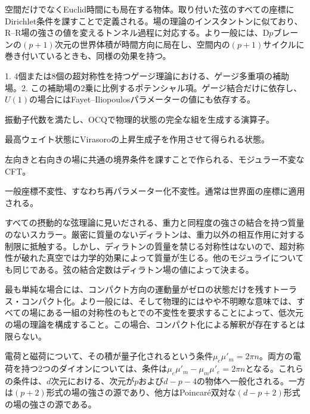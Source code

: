 {空間だけでなくEuclid時間にも局在する物体。取り付いた弦のすべての座標にDirichlet条件を課すことで定義される。場の理論のインスタントンに似ており、R--R場の強さの値を変えるトンネル過程に対応する。より一般には、D$p$ブレーンの$(p+1)$次元の世界体積が時間方向に局在し、空間内の$(p+1)$サイクルに巻き付いているときも、同様の効果を持つ。}


{1. 4個または8個の超対称性を持つゲージ理論における、ゲージ多重項の補助場。2. この補助場の2乗に比例するポテンシャル項。ゲージ結合だけに依存し、$U(1)$の場合にはFayet--Iliopoulosパラメーターの値にも依存する。}

{振動子代数を満たし、OCQで物理的状態の完全な組を生成する演算子。}

{最高ウェイト状態にVirasoroの上昇生成子を作用させて得られる状態。}

{左向きと右向きの場に共通の境界条件を課すことで作られる、モジュラー不変なCFT。}

{一般座標不変性、すなわち再パラメーター化不変性。通常は世界面の座標に適用される。}

{すべての摂動的な弦理論に見いだされる、重力と同程度の強さの結合を持つ質量のないスカラー。厳密に質量のないディラトンは、重力以外の相互作用に対する制限に抵触する。しかし、ディラトンの質量を禁じる対称性はないので、超対称性が破れた真空では力学的効果によって質量が生じる。他のモジュライについても同じである。弦の結合定数はディラトン場の値によって決まる。}

{最も単純な場合には、コンパクト方向の運動量がゼロの状態だけを残すトーラス・コンパクト化。より一般には、そして物理的にはやや不明瞭な意味では、すべての場にある一組の対称性のもとでの不変性を要求することによって、低次元の場の理論を構成すること。この場合、コンパクト化による解釈が存在するとは限らない。}

{電荷と磁荷について、その積が量子化されるという条件$\mu_e\mu'_m=2\pi n$。両方の電荷を持つ2つのダイオンについては、条件は\mbox{$\mu_e\mu'_m-\mu_m\mu'_e=2\pi n$}となる。これらの条件は、$d$次元における、次元が$p$および$d-p-4$の物体へ一般化される。一方は$(p+2)$形式の場の強さの源であり、他方はPoincaré双対な$(d-p+2)$形式の場の強さの源である。}

